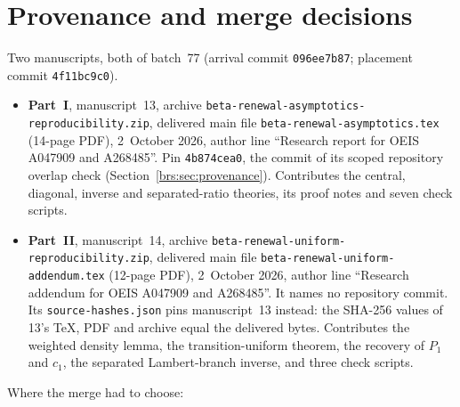 \documentclass[11pt]{article}
\numberwithin{equation}{section}
\theoremstyle{remark}\newtheorem{remark}[theorem]{Remark}
\newcommand{\file}[1]{\nolinkurl{#1}}
\begin{document}
\section*{Provenance and merge decisions}\label{brs:sec:mergeprovenance}
Two manuscripts, both of batch~77 (arrival commit \texttt{096ee7b87}; placement commit \texttt{4f11bc9c0}).
\begin{itemize}
\item \textbf{Part~I}, manuscript~13, archive \file{beta-renewal-asymptotics-reproducibility.zip}, delivered main file \file{beta-renewal-asymptotics.tex} (14-page PDF), 2~October 2026, author line ``Research report for OEIS A047909 and A268485''. Pin \texttt{4b874cea0}, the commit of its scoped repository overlap check (Section~\ref{brs:sec:provenance}). Contributes the central, diagonal, inverse and separated-ratio theories, its proof notes and seven check scripts.
\item \textbf{Part~II}, manuscript~14, archive \file{beta-renewal-uniform-reproducibility.zip}, delivered main file \file{beta-renewal-uniform-addendum.tex} (12-page PDF), 2~October 2026, author line ``Research addendum for OEIS A047909 and A268485''. It names no repository commit. Its \file{source-hashes.json} pins manuscript~13 instead: the SHA-256 values of 13's TeX, PDF and archive equal the delivered bytes. Contributes the weighted density lemma, the transition-uniform theorem, the recovery of $P_1$ and $c_1$, the separated Lambert-branch inverse, and three check scripts.
\end{itemize}
Where the merge had to choose:
\end{document}
